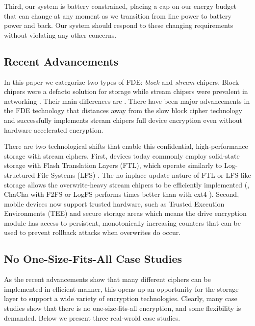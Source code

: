 Third, our system is battery constrained, placing a cap on our energy
budget that can change at any moment as we transition from line power to
battery power and back.  Our system should respond to these changing
requirements without violating any other concerns.



\subsection{Recent Advancements}

In this paper we categorize two types of FDE: {\em block} and {\em stream} chipers.
Block chipers were a defacto solution for storage while stream chipers
were prevalent in networking .  Their main differences are
.
There have been major advancements in the FDE
technology that distances away from the slow block cipher technology and
successfully implements stream chipers full device encryption
\cite{hbsh-citation???, Adiantum, StrongBox} even without hardware
accelerated encryption.  


There are two technological shifts that enable this confidential,
high-performance storage with stream ciphers.  First, devices today
commonly employ solid-state storage with Flash Translation Layers (FTL),
which operate similarly to Log-structured File Systems (LFS) \cite{21, 22,
  27-fromStrongBox}.  The no inplace update nature of FTL or LFS-like
storage allows the overwrite-heavy stream chipers to be efficiently
implemented (\eg, ChaCha with F2FS or LogFS performs \xxx times better
than with ext4 \cite{StrongBox}).  Second, mobile devices now support
trusted hardware, such as Trusted Execution Environments (TEE) \cite{24,
  29-fromStrongBox} and secure storage areas \cite{10-fromStrongBox} which
means the drive encryption module has access to persistent, monotonically
increasing counters that can be used to prevent rollback attacks when
overwrites do occur.


\subsection{No One-Size-Fits-All Case Studies}

As the recent advancements show that many different ciphers can be
implemented in efficient manner, this opens up an opportunity for the
storage layer to support a wide variety of encryption technologies.
Clearly, many case studies show that there is no one-size-fits-all
encryption, and some flexibility is demanded.  Below we present three
real-wrold case studies.

